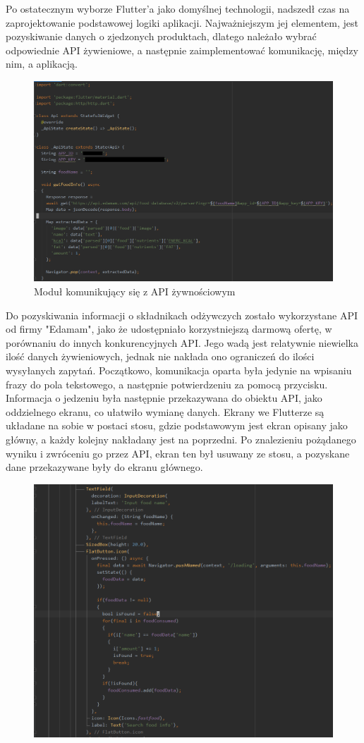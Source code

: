 \documentclass[12pt, a4paper]{article}
\begin{document}
\begin{sloppypar}
{{  Po ostatecznym wyborze Flutter'a jako domyślnej technologii, nadszedł czas na
  zaprojektowanie podstawowej logiki aplikacji. Najważniejszym jej elementem, jest
  pozyskiwanie danych o zjedzonych produktach, dlatego należało wybrać odpowiednie API
  żywieniowe, a następnie zaimplementować komunikację, między nim, a aplikacją. 
  \begin{figure}[H]
    \centering
    \includegraphics[width=.9\textwidth]{app_dev_1.PNG}
    \caption{Moduł komunikujący się z API żywnościowym}
    \label{fig:app1}
  \end{figure}
  Do pozyskiwania informacji o składnikach odżywczych zostało wykorzystane API od firmy
  "Edamam", jako że udostępniało korzystniejszą darmową ofertę, w porównaniu do innych
  konkurencyjnych API. Jego wadą jest relatywnie niewielka ilość danych żywieniowych,
  jednak nie nakłada ono ograniczeń do ilości wysyłanych zapytań.
  Początkowo, komunikacja oparta była jedynie na wpisaniu frazy do pola tekstowego, a
  następnie potwierdzeniu za pomocą przycisku. Informacja o jedzeniu była następnie
  przekazywana do obiektu API, jako oddzielnego ekranu, co ułatwiło wymianę danych.
  Ekrany we Flutterze są układane na sobie w postaci stosu, gdzie podstawowym jest ekran
  opisany jako główny, a każdy kolejny nakładany jest na poprzedni. Po znalezieniu
  pożądanego wyniku i zwróceniu go przez API, ekran ten był usuwany ze stosu, a pozyskane
  dane przekazywane były do ekranu głównego.  
  \begin{figure}[H]
    \centering
    \includegraphics[width=.9\textwidth]{app_dev_2.PNG}

\end{figure}}}
\end{sloppypar}
\end{document}
